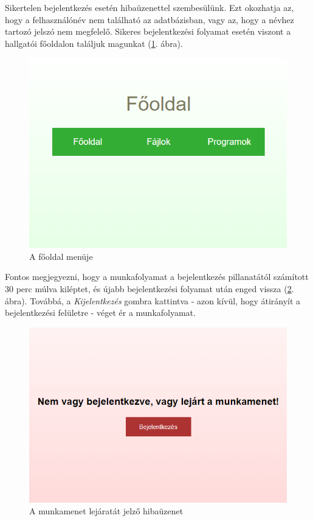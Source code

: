 \newpage

Sikertelen bejelentkezés esetén hibaüzenettel szembesülünk. Ezt okozhatja az, hogy a felhasználónév nem található az adatbázisban, vagy az, hogy a névhez tartozó jelszó nem megfelelő. Sikeres bejelentkezési folyamat esetén viszont a hallgatói főoldalon találjuk magunkat (\ref{fig:homeMenu}. ábra).

\begin{figure}[h]
	\centering
		\includegraphics[width=10truecm, height=7truecm]{images/fooldal.png}
	\caption{A főoldal menüje}
	\label{fig:homeMenu}
\end{figure}

Fontos megjegyezni, hogy a munkafolyamat a bejelentkezés pillanatától számított 30 perc múlva kiléptet, és újabb bejelentkezési folyamat után enged vissza (\ref{fig:invalid}. ábra). Továbbá, a \textit{Kijelentkezés} gombra kattintva - azon kívül, hogy átirányít a bejelentkezési felületre - véget ér a munkafolyamat.

\begin{figure}[h]
	\centering
		\includegraphics[width=10truecm, height=7truecm]{images/lejart_munkamenet.png}
	\caption{A munkamenet lejáratát jelző hibaüzenet}
	\label{fig:invalid}
\end{figure}

